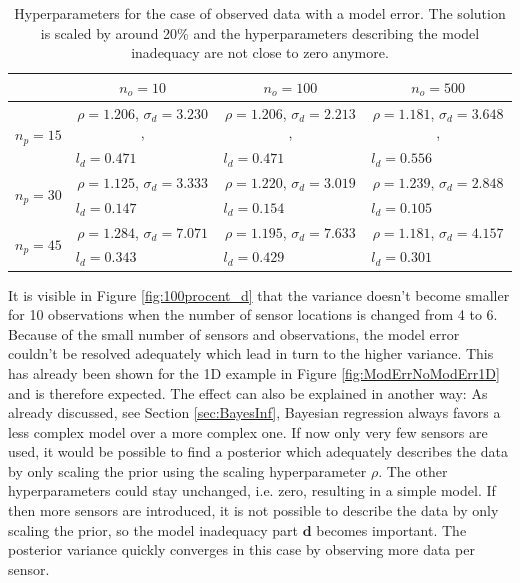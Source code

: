 \documentclass[%
  a4paper,oneside,%
  11pt,%
  smallchapters,
  style=printdev,
  extramargin,
  green,%
  rgb, <cmyk>
  ]{tubsbook}
\begin{document}
\begin{table}[!ht]
\centering
\caption{Hyperparameters for the case of observed data with a model error. The solution is scaled by around 20\% and the hyperparameters describing the model inadequacy are not close to zero anymore.}
\label{tab:100procWithError}
\begin{tabular}{@{}lccc@{}}
\toprule
                            & $n_o = 10$                      & $n_o = 100$                     & $n_o = 500$                     \\ \midrule
\multirow{2}{*}{$n_p = 15$} & $\rho=1.206$, $\sigma_d=3.230$, & $\rho=1.206$, $\sigma_d=2.213$, & $\rho=1.181$, $\sigma_d=3.648$, \\
                            & \multicolumn{1}{l}{$l_d=0.471$} & \multicolumn{1}{l}{$l_d=0.471$} & \multicolumn{1}{l}{$l_d=0.556$} \\
\multirow{2}{*}{$n_p = 30$} & $\rho=1.125$, $\sigma_d=3.333$  & $\rho=1.220$, $\sigma_d=3.019$  & $\rho=1.239$, $\sigma_d=2.848$  \\
                            & \multicolumn{1}{l}{$l_d=0.147$} & \multicolumn{1}{l}{$l_d=0.154$} & \multicolumn{1}{l}{$l_d=0.105$} \\
\multirow{2}{*}{$n_p = 45$} & $\rho=1.284$, $\sigma_d=7.071$  & $\rho=1.195$, $\sigma_d=7.633$  & $\rho=1.181$, $\sigma_d=4.157$  \\
                            & \multicolumn{1}{l}{$l_d=0.343$} & \multicolumn{1}{l}{$l_d=0.429$} & \multicolumn{1}{l}{$l_d=0.301$} \\ \bottomrule
\end{tabular}
\end{table}
%
It is visible in Figure \ref{fig:100procent_d} that the variance doesn't become smaller for 10 observations when the number of sensor locations is changed from 4 to 6. Because of the small number of sensors and observations, the model error couldn't be resolved adequately which lead in turn to the higher variance. This has already been shown for the 1D example in Figure \ref{fig:ModErrNoModErr1D} and is therefore expected. The effect can also be explained in another way: As already discussed, see Section \ref{sec:BayesInf}, Bayesian regression always favors a less complex model over a more complex one. If now only very few sensors are used, it would be possible to find a posterior which adequately describes the data by only scaling the prior using the scaling hyperparameter $\rho$. The other hyperparameters could stay unchanged, i.e. zero, resulting in a simple model. If then more sensors are introduced, it is not possible to describe the data by only scaling the prior, so the model inadequacy part $\bm{d}$ becomes important. The posterior variance quickly converges in this case by observing more data per sensor.
\end{document}
